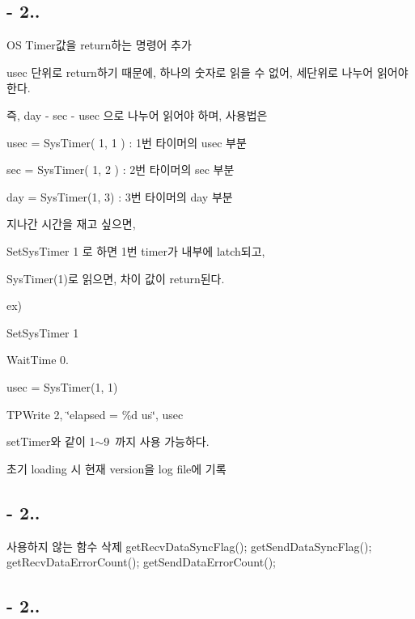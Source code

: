 \subsection*{-\/ 2..}


\begin{DoxyEnumerate}
\item O\-S Timer값을 return하는 명령어 추가\par
 usec 단위로 return하기 때문에, 하나의 숫자로 읽을 수 없어, 세단위로 나누어 읽어야 한다.\par
 즉, day -\/ sec -\/ usec 으로 나누어 읽어야 하며, 사용법은\par


usec = Sys\-Timer( 1, 1 ) \-: 1번 타이머의 usec 부분\par
 sec = Sys\-Timer( 1, 2 ) \-: 2번 타이머의 sec 부분\par
 day = Sys\-Timer(1, 3) \-: 3번 타이머의 day 부분\par


지나간 시간을 재고 싶으면,\par
 Set\-Sys\-Timer 1 로 하면 1번 timer가 내부에 latch되고,\par
 Sys\-Timer(1)로 읽으면, 차이 값이 return된다.\par


ex)\par
 Set\-Sys\-Timer 1\par
 Wait\-Time 0.\par
 usec = Sys\-Timer(1, 1)\par
 T\-P\-Write 2, \char`\"{}elapsed = \%d us\char`\"{}, usec\par


set\-Timer와 같이 1$\sim$9 까지 사용 가능하다.
\item 초기 loading 시 현재 version을 log file에 기록
\end{DoxyEnumerate}

\subsection*{-\/ 2..}


\begin{DoxyEnumerate}
\item 사용하지 않는 함수 삭제 get\-Recv\-Data\-Sync\-Flag(); get\-Send\-Data\-Sync\-Flag(); get\-Recv\-Data\-Error\-Count(); get\-Send\-Data\-Error\-Count();
\end{DoxyEnumerate}

\subsection*{-\/ 2..}


